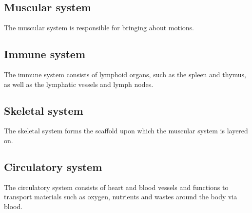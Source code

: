 \documentclass[11pt]{article}
\begin{document}
\subsection{Muscular system}
\label{sec:org0eab19b}
The muscular system is responsible for bringing about motions.
\subsection{Immune system}
\label{sec:org45729ee}
The immune system consists of lymphoid organs, such as the spleen and thymus, as well as the lymphatic vessels and lymph nodes.
\subsection{Skeletal system}
\label{sec:org1cf882f}
The skeletal system forms the scaffold upon which the muscular system is layered on.
\subsection{Circulatory system}
\label{sec:org58a60db}
The circulatory system consists of heart and blood vessels and functions to transport materials such as oxygen, nutrients and wastes around the body via blood.
\end{document}
